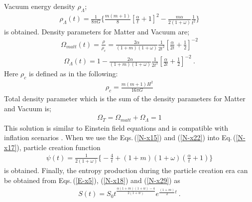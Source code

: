 \documentclass[superscriptaddress,showpacs,pre,twocolumn]{revtex4-1}
\begin{document}
Vacuum energy density $\rho_{\Lambda}$;
\begin{eqnarray} \label{N-x24}
\rho_{\Lambda}(t) = \frac{1}{8\pi G} \Bigg\{ \frac{m(m+1)}{8} \left[ \frac{\alpha}{t} + 1  \right]^{2} - \frac{m \alpha}{2(1+\omega)} \frac{1}{t^{2}} \Bigg\}
\end{eqnarray}
is obtained. Density parameters for Matter and Vacuum are;  
\begin{eqnarray} \label{N-x25}
\Omega_{matt}(t)=\frac{\rho}{\rho_{c}} =\frac{2\alpha}{(1+m)(1+\omega)}\frac{1}{2t^{2}}\left[ \frac{\alpha}{2t} + \frac{1}{2}  \right]^{-2}
\end{eqnarray}
\begin{eqnarray} \label{N-x26}
\Omega_{\Lambda}(t)= 1- \frac{2\alpha}{(1+m)(1+\omega)}\frac{1}{2t^{2}}\left[ \frac{\alpha}{2t} + \frac{1}{2}  \right]^{-2} \ .
\end{eqnarray}
Here $\rho_{c}$ is defined as in the following:
\begin{eqnarray} \label{N-x27}
\rho_{c} = \frac{m(m+1)H^{2}}{16 \pi G}
\end{eqnarray}
Total density parameter which is the sum of the density parameters for Matter and Vacuum is;
\begin{eqnarray} \label{N-x28}
\Omega_{T} = \Omega_{matt} + \Omega_{\Lambda} = 1
\end{eqnarray}
This solution is similar to Einstein field equations and is compatible with inflation scenarios \cite{Singh2012}.
When we use the Eqs.\,(\ref{N-x15}) and (\ref{N-x22}) into Eq.\,(\ref{N-x17}), particle creation function 
\begin{eqnarray} \label{N-x29}
\psi(t) = \frac{1}{2(1+\omega)} \Big\{ -\frac{4}{t} + (1+m) (1+\omega) \left( \frac{\alpha}{t} + 1 \right)  \Big\}
\end{eqnarray}
is obtained. Finally, the entropy production during the particle creation era can be obtained from Eqs.\,(\ref{E-x5}), (\ref{N-x18}) and (\ref{N-x29}) as
\begin{eqnarray} \label{N-e1}
S(t) = S_{0} t^{\frac{\alpha(1+m)(1+w)-4}{2(1+w)}} e^{\frac{(1+m)}{2}t} \ .
\end{eqnarray}
\end{document}
